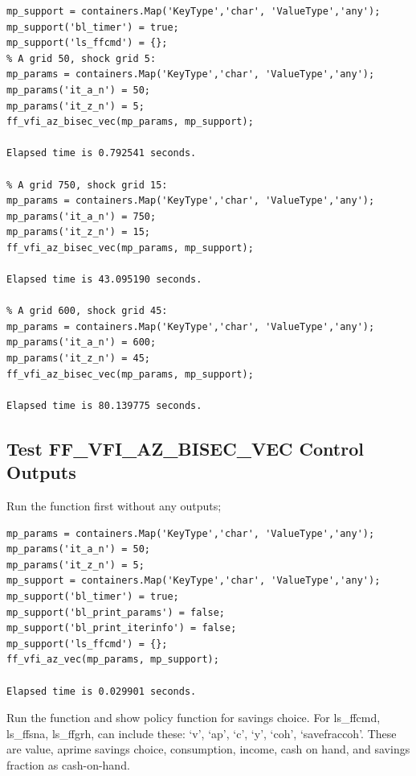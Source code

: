 \documentclass[
]{book}
\begin{document}
\begin{verbatim}
mp_support = containers.Map('KeyType','char', 'ValueType','any');
mp_support('bl_timer') = true;
mp_support('ls_ffcmd') = {};
% A grid 50, shock grid 5:
mp_params = containers.Map('KeyType','char', 'ValueType','any');
mp_params('it_a_n') = 50;
mp_params('it_z_n') = 5;
ff_vfi_az_bisec_vec(mp_params, mp_support);

Elapsed time is 0.792541 seconds.

% A grid 750, shock grid 15:
mp_params = containers.Map('KeyType','char', 'ValueType','any');
mp_params('it_a_n') = 750;
mp_params('it_z_n') = 15;
ff_vfi_az_bisec_vec(mp_params, mp_support);

Elapsed time is 43.095190 seconds.

% A grid 600, shock grid 45:
mp_params = containers.Map('KeyType','char', 'ValueType','any');
mp_params('it_a_n') = 600;
mp_params('it_z_n') = 45;
ff_vfi_az_bisec_vec(mp_params, mp_support);

Elapsed time is 80.139775 seconds.
\end{verbatim}

\hypertarget{test-ff_vfi_az_bisec_vec-control-outputs}{%
\subsection{Test FF\_VFI\_AZ\_BISEC\_VEC Control Outputs}\label{test-ff_vfi_az_bisec_vec-control-outputs}}

Run the function first without any outputs;

\begin{verbatim}
mp_params = containers.Map('KeyType','char', 'ValueType','any');
mp_params('it_a_n') = 50;
mp_params('it_z_n') = 5;
mp_support = containers.Map('KeyType','char', 'ValueType','any');
mp_support('bl_timer') = true;
mp_support('bl_print_params') = false;
mp_support('bl_print_iterinfo') = false;
mp_support('ls_ffcmd') = {};
ff_vfi_az_vec(mp_params, mp_support);

Elapsed time is 0.029901 seconds.
\end{verbatim}

Run the function and show policy function for savings choice. For
ls\_ffcmd, ls\_ffsna, ls\_ffgrh, can include these: `v', `ap', `c', `y',
`coh', `savefraccoh'. These are value, aprime savings choice,
consumption, income, cash on hand, and savings fraction as cash-on-hand.
\end{document}
